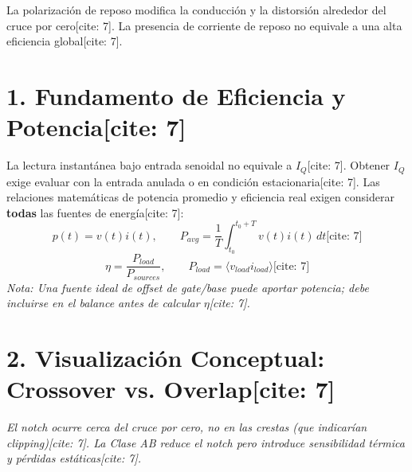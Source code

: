 \documentclass[11pt, a4paper]{article}
\begin{document}
\begin{tcolorbox}[colback=ucbblue!5, colframe=ucbblue, title=\textbf{Cierre Conceptual: Topologías A, B y AB {[cite: 7]}}]
    La polarización de reposo modifica la conducción y la distorsión alrededor del cruce por cero[cite: 7]. La presencia de corriente de reposo no equivale a una alta eficiencia global[cite: 7].
\end{tcolorbox}

\section*{1. Fundamento de Eficiencia y Potencia[cite: 7]}
La lectura instantánea bajo entrada senoidal no equivale a $I_Q$[cite: 7]. Obtener $I_Q$ exige evaluar con la entrada anulada o en condición estacionaria[cite: 7].
Las relaciones matemáticas de potencia promedio y eficiencia real exigen considerar \textbf{todas} las fuentes de energía[cite: 7]:
\begin{equation*}
    p(t) = v(t)i(t), \qquad P_{avg} = \frac{1}{T} \int_{t_0}^{t_0+T} v(t)i(t)\,dt \text{[cite: 7]}
\end{equation*}
\begin{equation*}
    \eta = \frac{P_{load}}{P_{sources}}, \qquad P_{load} = \langle v_{load} i_{load} \rangle \text{[cite: 7]}
\end{equation*}
\textit{Nota: Una fuente ideal de offset de gate/base puede aportar potencia; debe incluirse en el balance antes de calcular $\eta$[cite: 7].}

\section*{2. Visualización Conceptual: Crossover vs. Overlap[cite: 7]}
\begin{center}
\end{center}
\textit{El notch ocurre cerca del cruce por cero, no en las crestas (que indicarían clipping)[cite: 7]. La Clase AB reduce el notch pero introduce sensibilidad térmica y pérdidas estáticas[cite: 7].}
\end{document}

